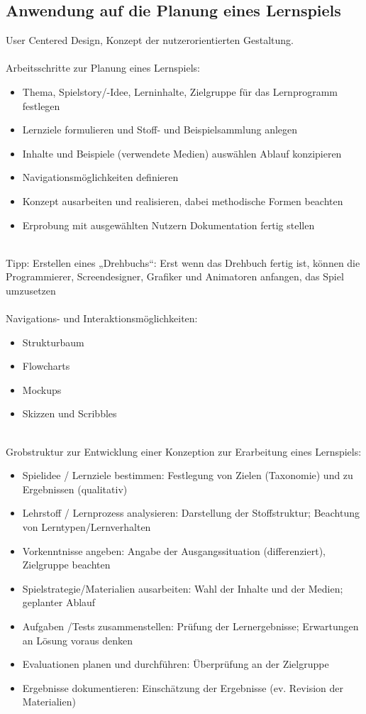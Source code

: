 \documentclass[a4paper]{article}
\begin{document}
\subsection{Anwendung auf die Planung eines Lernspiels}
User Centered Design, Konzept der nutzerorientierten Gestaltung.\\
\\
Arbeitsschritte zur Planung eines Lernspiels:

\begin{itemize}
	\item Thema, Spielstory/-Idee, Lerninhalte, Zielgruppe für das Lernprogramm festlegen
	\item Lernziele formulieren und Stoff- und Beispielsammlung anlegen
	\item Inhalte und Beispiele (verwendete Medien) auswählen \textrightarrow Ablauf konzipieren
	\item Navigationsmöglichkeiten definieren
	\item Konzept ausarbeiten und realisieren, dabei methodische Formen beachten
	\item Erprobung mit ausgewählten Nutzern \textrightarrow Dokumentation fertig stellen
\end{itemize}
~\\
Tipp: Erstellen eines „Drehbuchs“: Erst wenn das Drehbuch fertig ist, können die Programmierer, Screendesigner, Grafiker und Animatoren anfangen, das Spiel umzusetzen
\\~\\
Navigations- und Interaktionsmöglichkeiten:
\begin{itemize}
	\item Strukturbaum
	\item Flowcharts
	\item Mockups
	\item Skizzen und Scribbles
\end{itemize}
~\\
Grobstruktur zur Entwicklung einer Konzeption zur Erarbeitung eines Lernspiels:
\begin{itemize}
	\item Spielidee / Lernziele bestimmen: Festlegung von Zielen (Taxonomie) und zu Ergebnissen (qualitativ)
	\item Lehrstoff / Lernprozess analysieren: Darstellung der Stoffstruktur; Beachtung von Lerntypen/Lernverhalten
	\item Vorkenntnisse angeben: Angabe der Ausgangssituation (differenziert), Zielgruppe beachten
	\item Spielstrategie/Materialien ausarbeiten: Wahl der Inhalte und der Medien; geplanter Ablauf
	\item Aufgaben /Tests zusammenstellen: Prüfung der Lernergebnisse; Erwartungen an Lösung voraus denken
	\item Evaluationen planen und durchführen: Überprüfung an der Zielgruppe
	\item Ergebnisse dokumentieren: Einschätzung der Ergebnisse (ev. Revision der
	Materialien)
\end{itemize}
\end{document}
